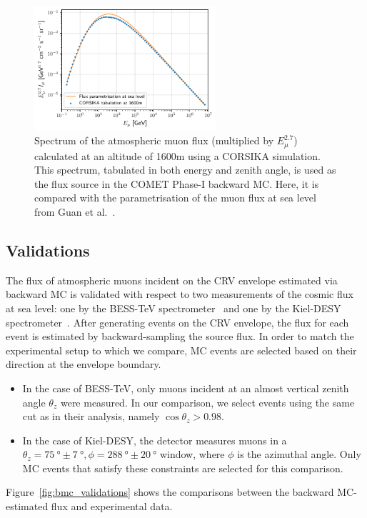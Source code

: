 \begin{figure}
    \centering
    \includegraphics[width=0.6\textwidth]{chapter5/flux_distribution.pdf}
    \caption{ Spectrum of the atmospheric muon flux (multiplied by
        $E_\mu^{2.7}$) calculated at an altitude of 1600m using a CORSIKA
        simulation. This spectrum, tabulated in both energy and zenith angle, is
        used as the flux source in the COMET Phase-I backward MC. Here, it is
        compared with the parametrisation of the muon flux at sea level from Guan
        et al.~\cite{gccly}. }
    \label{fig:corsika_flux_distribution}
\end{figure}


\subsection{Validations}
The flux of atmospheric muons incident on the CRV envelope estimated via
backward MC is validated with respect to two measurements of the cosmic flux at
sea level: one by the BESS-TeV spectrometer~\cite{besstev} and one by the
Kiel-DESY spectrometer~\cite{kieldesy}. 
After generating events on the CRV envelope, the flux for each event is
estimated by backward-sampling the source flux. In order to match
the experimental setup to which we compare, MC events are selected based
on their direction at the envelope boundary. 

\begin{itemize}
\item In the case of BESS-TeV, only muons incident at an almost vertical zenith
angle $\theta_z$ were measured. In our comparison, we select events using the
same cut as in their analysis, namely $\cos \theta_z > 0.98$.

\item In the case of Kiel-DESY, the detector measures muons in a $\theta_z =
\SI{75}{\degree} \pm \SI{7}{\degree}, \phi = \SI{288}{\degree} \pm
\SI{20}{\degree}$ window, where $\phi$ is the azimuthal angle. Only MC events
that satisfy these constraints are selected for this comparison.
\end{itemize}
Figure~\ref{fig:bmc_validations} shows the comparisons between the backward
MC-estimated flux and experimental data.

